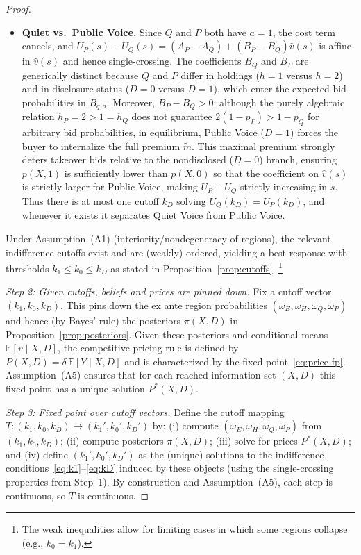 \documentclass[11pt]{article}
\newcommand{\E}{\mathbb{E}}
\newcommand{\1}{\mathbf{1}}
\begin{document}
\begin{proof}
\begin{itemize}[leftmargin=1.5em,itemsep=2pt]
\item \textbf{Quiet vs.\ Public Voice.} Since $Q$ and $P$ both have $a=1$, the cost term cancels, and $U_P(s)-U_Q(s)=(A_P-A_Q)+(B_P-B_Q)\hat v(s)$ is affine in $\hat v(s)$ and hence single-crossing. The coefficients $B_Q$ and $B_P$ are generically distinct because $Q$ and $P$ differ in holdings ($h=1$ versus $h=2$) and in disclosure status ($D=0$ versus $D=1$), which enter the expected bid probabilities in $B_{q,a}$. Moreover, $B_P-B_Q>0$: although the purely algebraic relation $h_P=2>1=h_Q$ does not guarantee $2(1-p_P) > 1-p_Q$ for arbitrary bid probabilities, in equilibrium, Public Voice ($D=1$) forces the buyer to internalize the full premium $\tilde{m}$. This maximal premium strongly deters takeover bids relative to the nondisclosed ($D=0$) branch, ensuring $p(X,1)$ is sufficiently lower than $p(X,0)$ so that the coefficient on $\hat v(s)$ is strictly larger for Public Voice, making $U_P-U_Q$ strictly increasing in $s$. Thus there is at most one cutoff $k_D$ solving $U_Q(k_D)=U_P(k_D)$, and whenever it exists it separates Quiet Voice from Public Voice.
\end{itemize}
Under Assumption~\textup{(A1)} (interiority/nondegeneracy of regions), the relevant indifference cutoffs exist and are (weakly) ordered, yielding a best response with thresholds $k_1\le k_0\le k_D$ as stated in Proposition~\ref{prop:cutoffs}.%
\footnote{The weak inequalities allow for limiting cases in which some regions collapse (e.g., $k_0=k_1$).}

\textit{Step 2: Given cutoffs, beliefs and prices are pinned down.}
Fix a cutoff vector $(k_1,k_0,k_D)$. This pins down the ex ante region probabilities $(\omega_E,\omega_H,\omega_Q,\omega_P)$ and hence (by Bayes' rule) the posteriors $\pi(X,D)$ in Proposition~\ref{prop:posteriors}. Given these posteriors and conditional means $\E[v \mid X,D]$, the competitive pricing rule is defined by $P(X,D)=\delta\,\E[Y \mid X,D]$ and is characterized by the fixed point~\eqref{eq:price-fp}. Assumption~\textup{(A5)} ensures that for each reached information set $(X,D)$ this fixed point has a unique solution $P^*(X,D)$.

\textit{Step 3: Fixed point over cutoff vectors.}
Define the cutoff mapping $T:(k_1,k_0,k_D)\mapsto(k_1',k_0',k_D')$ by: (i) compute $(\omega_E,\omega_H,\omega_Q,\omega_P)$ from $(k_1,k_0,k_D)$; (ii) compute posteriors $\pi(X,D)$; (iii) solve for prices $P^*(X,D)$; and (iv) define $(k_1',k_0',k_D')$ as the (unique) solutions to the indifference conditions~\eqref{eq:k1}--\eqref{eq:kD} induced by these objects (using the single-crossing properties from Step~1). By construction and Assumption~\textup{(A5)}, each step is continuous, so $T$ is continuous.


\end{proof}
\end{document}
